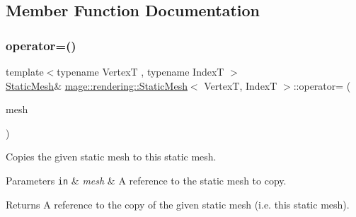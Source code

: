 \subsection{Member Function Documentation}
\hypertarget{classmage_1_1rendering_1_1_static_mesh_a62f007ca9d1dc316519468fb7b74af19}{}\label{classmage_1_1rendering_1_1_static_mesh_a62f007ca9d1dc316519468fb7b74af19} 
\subsubsection{\texorpdfstring{operator=()}{operator=()}\hspace{0.1cm}{\footnotesize\ttfamily [1/2]}}
{\footnotesize\ttfamily template$<$typename VertexT , typename IndexT $>$ \\
\hyperlink{classmage_1_1rendering_1_1_static_mesh}{Static\+Mesh}\& \hyperlink{classmage_1_1rendering_1_1_static_mesh}{mage\+::rendering\+::\+Static\+Mesh}$<$ VertexT, IndexT $>$\+::operator= (\begin{DoxyParamCaption}\item[{const \hyperlink{classmage_1_1rendering_1_1_static_mesh}{Static\+Mesh}$<$ VertexT, IndexT $>$ \&}]{mesh }\end{DoxyParamCaption})\hspace{0.3cm}{\ttfamily [delete]}}

Copies the given static mesh to this static mesh.


\begin{DoxyParams}[1]{Parameters}
\mbox{\tt in}  & {\em mesh} & A reference to the static mesh to copy. \\
\hline
\end{DoxyParams}
\begin{DoxyReturn}{Returns}
A reference to the copy of the given static mesh (i.\+e. this static mesh). 
\end{DoxyReturn}
\hypertarget{classmage_1_1rendering_1_1_static_mesh_ab4b3e0d32af550bf440cc2aaf731a350}{}\label{classmage_1_1rendering_1_1_static_mesh_ab4b3e0d32af550bf440cc2aaf731a350} 
